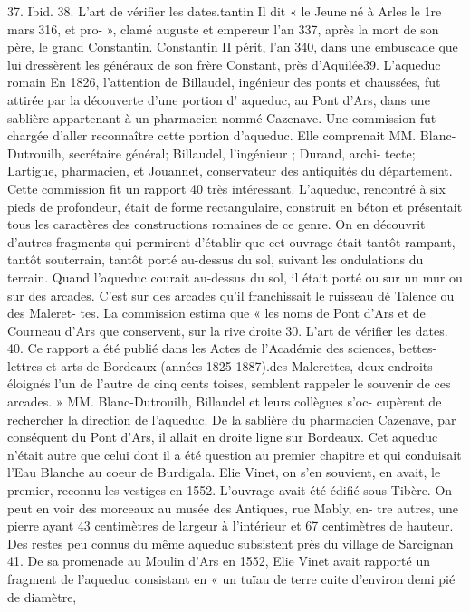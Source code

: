 \documentclass[a4paper,11pt]{book}
\begin{document}
37. Ibid.
38. L'art de vérifier les dates.tantin Il dit « le Jeune né à Arles le 1re mars 316, et pro-
»,
clamé auguste et empereur l'an 337, après la mort de son
père, le grand Constantin.
Constantin II périt, l'an 340, dans une embuscade que
lui dressèrent les généraux de
son frère Constant, près
d'Aquilée39.
L'aqueduc romain
En 1826, l'attention de Billaudel, ingénieur des ponts et
chaussées, fut attirée par la découverte d'une portion
d' aqueduc,
au Pont d'Ars, dans une sablière appartenant
à un pharmacien nommé Cazenave.
Une commission fut chargée d'aller reconnaître cette
portion d'aqueduc. Elle comprenait MM. Blanc-Dutrouilh,
secrétaire général; Billaudel, l'ingénieur ; Durand, archi-
tecte; Lartigue, pharmacien, et Jouannet, conservateur des
antiquités du département.
Cette commission fit un rapport 40 très intéressant.
L'aqueduc, rencontré à six pieds de profondeur, était
de forme rectangulaire, construit en béton et présentait
tous les caractères des constructions romaines de ce genre.
On en découvrit d'autres fragments qui permirent d'établir
que cet ouvrage était tantôt rampant, tantôt souterrain,
tantôt porté au-dessus du sol, suivant les ondulations du
terrain.
Quand l'aqueduc courait au-dessus du sol, il était porté
ou sur un mur ou sur des arcades. C'est sur des arcades
qu'il franchissait le ruisseau dé Talence ou des Maleret-
tes. La commission estima que « les noms de Pont d'Ars
et de Courneau d'Ars que conservent, sur la rive droite
30. L'art de vérifier les dates.
40. Ce rapport a été publié dans les Actes de l'Académie des sciences,
bettes-lettres et arts de Bordeaux (années 1825-1887).des Malerettes, deux endroits éloignés l'un de l'autre de
cinq cents toises, semblent rappeler le souvenir de ces
arcades. »
MM. Blanc-Dutrouilh, Billaudel et leurs collègues s'oc-
cupèrent de rechercher la direction de l'aqueduc. De la
sablière du pharmacien Cazenave, par conséquent du Pont
d'Ars, il allait en droite ligne sur Bordeaux.
Cet aqueduc n'était autre que celui dont il a été question
au premier chapitre et qui conduisait l'Eau Blanche au
coeur de Burdigala. Elie Vinet, on s'en souvient, en
avait, le premier, reconnu les vestiges en 1552.
L'ouvrage avait été édifié sous Tibère. On peut en
voir des morceaux au musée des Antiques, rue Mably, en-
tre autres, une pierre ayant 43 centimètres de largeur à
l'intérieur et 67 centimètres de hauteur.
Des restes peu connus du même aqueduc subsistent
près du village de Sarcignan 41.
De sa promenade au Moulin d'Ars en 1552, Elie Vinet
avait rapporté un fragment de l'aqueduc consistant en
« un tuïau de terre cuite d'environ demi pié de diamètre,
\end{document}
